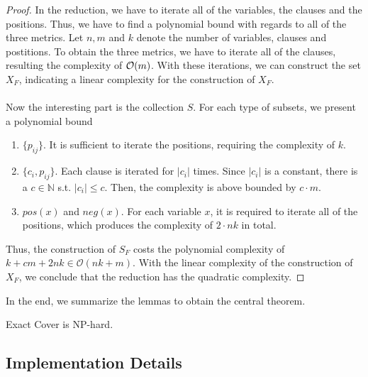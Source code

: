 \begin{proof}
    In the reduction, we have to iterate all of the variables, the clauses and the positions. 
    Thus, we have to find a polynomial bound with regards to all of the three metrics. Let $n, m$ and $k$ denote 
    the number of variables, clauses and postitions. To obtain the three metrics, we have to iterate 
    all of the clauses, resulting the complexity of $\mathcal{O}({m})$. With these iterations, we can construct the set $X_F$,
    indicating a linear complexity for the construction of $X_F$. \\\\
    Now the interesting part is the collection $S$. For each type of subsets, we present a polynomial bound 
\begin{enumerate}
    \item $\{p_{ij}\}$. It is sufficient to iterate the positions, requiring the complexity of $k$.
    \item $\{c_i, p_{ij}\}$. Each clause is iterated for $|c_i|$ times. Since $|c_i|$ is a constant, there is a $c \in \mathbb{N}$ 
    s.t. $|c_i| \leq c$. Then, the complexity is above bounded by $c \cdot m$.
    \item $pos(x)$ and $neg(x)$. For each variable $x$, it is required to iterate all of the positions, which produces the complexity 
    of $2 \cdot nk$ in total.
\end{enumerate}
Thus, the construction of $S_F$ costs the polynomial complexity of $k + cm + 2nk \in \mathcal{O}(nk + m)$. 
With the linear complexity of the construction of $X_F$, we conclude that the reduction has the quadratic complexity.
\end{proof}
In the end, we summarize the lemmas to obtain the central theorem.
\begin{theorem}
    Exact Cover is NP-hard.
\end{theorem}

\subsection{Implementation Details}
\label{sec:sat-imp}
